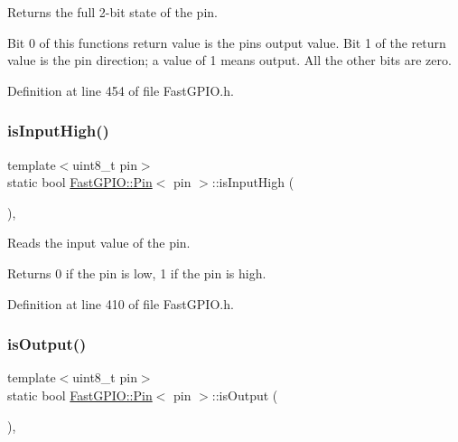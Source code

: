 Returns the full 2-\/bit state of the pin. 

Bit 0 of this function\textquotesingle{}s return value is the pin\textquotesingle{}s output value. Bit 1 of the return value is the pin direction; a value of 1 means output. All the other bits are zero. 

Definition at line 454 of file Fast\+G\+P\+I\+O.\+h.

\mbox{\label{class_fast_g_p_i_o_1_1_pin_acbc38591335717f3feeed14f53b7b79c}} 
\subsubsection{\texorpdfstring{is\+Input\+High()}{isInputHigh()}}
{\footnotesize\ttfamily template$<$uint8\+\_\+t pin$>$ \\
static bool \hyperlink{class_fast_g_p_i_o_1_1_pin}{Fast\+G\+P\+I\+O\+::\+Pin}$<$ pin $>$\+::is\+Input\+High (\begin{DoxyParamCaption}{ }\end{DoxyParamCaption})\hspace{0.3cm}{\ttfamily [inline]}, {\ttfamily [static]}}



Reads the input value of the pin. 

\begin{DoxyReturn}{Returns}
0 if the pin is low, 1 if the pin is high. 
\end{DoxyReturn}


Definition at line 410 of file Fast\+G\+P\+I\+O.\+h.

\mbox{\label{class_fast_g_p_i_o_1_1_pin_ae068011f1d705b9f8f889b32c4b315b3}} 
\subsubsection{\texorpdfstring{is\+Output()}{isOutput()}}
{\footnotesize\ttfamily template$<$uint8\+\_\+t pin$>$ \\
static bool \hyperlink{class_fast_g_p_i_o_1_1_pin}{Fast\+G\+P\+I\+O\+::\+Pin}$<$ pin $>$\+::is\+Output (\begin{DoxyParamCaption}{ }\end{DoxyParamCaption})\hspace{0.3cm}{\ttfamily [inline]}, {\ttfamily [static]}}




